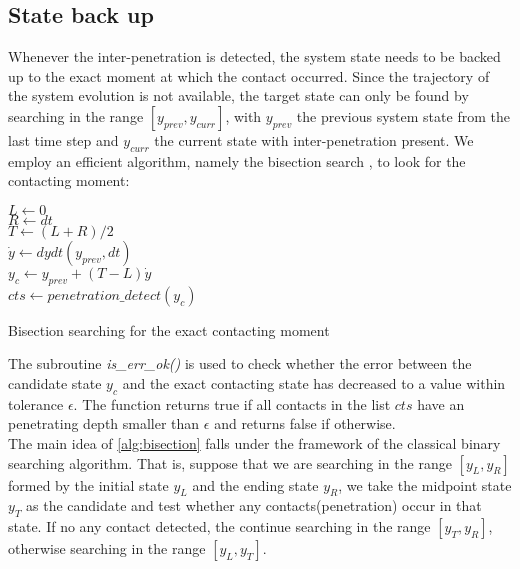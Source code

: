 \subsection{State back up}
Whenever the inter-penetration is detected, the system state needs to be backed up to the exact moment at which the contact occurred. Since the trajectory of the system evolution is not available, the target state can only be found by searching in the range $[y_{prev},y_{curr}]$, with $y_{prev}$ the previous system state from the last time step and $y_{curr}$ the current state with inter-penetration present. We employ an efficient algorithm, namely the bisection search \cite{coursenote}, to look for the contacting moment:
\begin{algorithm}[htbp]
    \SetAlgoLined
    $L \leftarrow 0$\\
    $R \leftarrow dt$\\
    $T \leftarrow (L+R)/2$\\
    $\Dot{y} \leftarrow dydt(y_{prev},dt)$ \\
    $y_c \leftarrow y_{prev}+(T-L)\Dot{y}$\\
    $cts \leftarrow penetration\_detect(y_c)$\\
    \caption{Bisection searching for the exact contacting moment}\label{alg:bisection}
\end{algorithm}
The subroutine \emph{is\_err\_ok()} is used to check whether the error between the candidate state $y_c$ and the exact contacting state has decreased to a value within tolerance $\epsilon$. The function returns true if all contacts in the list $cts$ have an penetrating depth smaller than $\epsilon$ and returns false if otherwise.\\
The main idea of \autoref{alg:bisection} falls under the framework of the classical binary searching algorithm. That is, suppose that we are searching in the range $[y_L,y_R]$ formed by the initial state $y_L$ and the ending state $y_R$, we take the midpoint state $y_{T}$ as the candidate and test whether any contacts(penetration) occur in that state. If no any contact detected, the continue searching in the range $[y_T,y_R]$, otherwise searching in the range $[y_L,y_T]$. 

